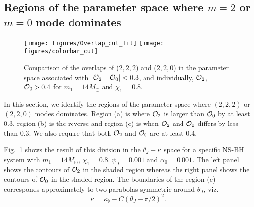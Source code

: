 \documentclass[preprint,onecolumn,,tightenlines,superscriptaddress,showpacs,nofootinbib,eqsecnum,amsfonts,amsmath]{revtex4}
\begin{document}
\subsection{Regions of the parameter space where $m=2$ or $m=0$ mode dominates}

\begin{figure}
 \centering
 {\texttt{[image: figures/Overlap\_cut\_fit]}
\hspace{.1cm}
\texttt{[image: figures/colorbar\_cut]}
 } 
\caption{ Comparison of the overlaps of ($2,2,2$) and ($2,2,0$) in the parameter space associated with $|{\cal{O}}_2-{\cal{O}}_0|< 0.3$, 
and individually, ${\cal{O}}_2$, ${\cal{O}}_0 > 0.4$ for $m_{1}=14M_{\odot}$ and $\chi_1=0.8$.}
\label{regions_1_2}
\end{figure}

In this section, we identify the regions of the parameter space where $(2,2,2)$
or $(2,2,0)$ modes dominates.  Region (a) is where ${\cal{O}}_2$ is larger than
${\cal{O}}_0$ by at least $0.3$, region (b) is the reverse and region (c) is
when ${\cal{O}}_2$ and ${\cal{O}}_0$ differs by less than $0.3$.  We also
require that both ${\cal O}_2$ and ${\cal O}_0$ are at least $0.4$.

Fig.~\ref{regions_1_2} shows the result of this division in the
$\theta_J-\kappa$ space for a specific NS-BH system with $m_{1}=14 M_\odot$,
$\chi_1=0.8$, $\psi_J=0.001$ and $\alpha_0 =0.001$. The
left panel shows the contours of ${\cal O}_2$ in the shaded region whereas the
right panel shows the contours of ${\cal O}_0$ in the shaded region. The
boundaries of the region (c) corresponds approximately to two parabolas
symmetric around $\theta_J$, viz.
\begin{equation}
 \kappa = \kappa_{0} - C(\theta_J-\pi/2)^2. 
\end{equation}
\end{document}
